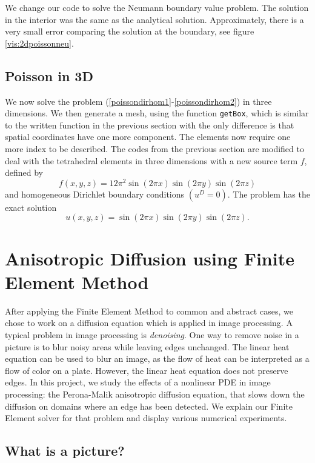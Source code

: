 \documentclass{report}
\begin{document}
We change our code to solve the Neumann boundary value problem. The solution in the interior was the same as the analytical solution. Approximately, there is a very small error comparing the solution at the boundary, see figure \ref{vis:2dpoissonneu}.

\section{Poisson in 3D}

We now solve the problem (\ref{poissondirhom1}-\ref{poissondirhom2}) in three dimensions. We then generate a mesh, using the function \texttt{getBox}, which is similar to the written function in the previous section with the only difference is that spatial coordinates have one more component. The elements now require one more index to be described. The codes from the previous section are modified to deal with the tetrahedral elements in three dimensions with a new source term $f$, defined by
\begin{equation}
	f(x,y,z) = 12\pi^2\sin (2\pi x)\sin (2\pi y)\sin (2\pi z)
\end{equation}
and homogeneous Dirichlet boundary conditions $(u^D = 0)$. The problem has the exact solution
\begin{equation}
	u(x,y,z) = \sin (2\pi x)\sin (2\pi y)\sin (2\pi z).
\end{equation}

\chapter{Anisotropic Diffusion using Finite Element Method}

After applying the Finite Element Method to common and abstract cases, we chose to work on a diffusion equation which is applied in image processing. A typical problem in image processing is \emph{denoising}. One way to remove noise in a picture is to blur noisy areas while leaving edges unchanged. The linear heat equation can be used to blur an image, as the flow of heat can be interpreted as a flow of color on a plate. However, the linear heat equation does not preserve edges. In this project, we study the effects of a nonlinear PDE in image processing: the Perona-Malik anisotropic diffusion equation, that slows down the diffusion on domains where an edge has been detected. We explain our Finite Element solver for that problem and display various numerical experiments.

\section{What is a picture?}
\end{document}
